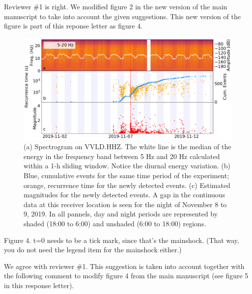 \documentclass[10pt]{extarticle}
\begin{document}
\begin{Answer}
Reviewer \#1 is right. We modified figure 2 in the new version of the main manuscript to take into account the given suggestions. This new version of the figure is part of this reponse letter as figure 4.
 \WorkInProgressRevTask
\begin{figure}[!h]
\begin{center}
 \includegraphics[width=1\linewidth]{spec_rec_mag.png} 
 \caption{(a) Spectrogram on VVLD.HHZ. The white line is the median of the energy in the frequency band between 5 Hz and 20 Hz calculated within a 1-h sliding window. Notice the diurnal energy variation. (b) Blue, cumulative events for the same time period of the experiment; orange, recurrence time for the newly detected events. (c) Estimated magnitudes for the newly detected events. A gap in the continuous data at this receiver location is seen for the night of November 8 to 9, 2019. In all pannels, day and night periods are represented by shaded (18:00 to 6:00) and unshaded (6:00 to 18:00) regions.}
\end{center}
\label{fig:new_fig_2}
\end{figure}
\end{Answer}
%
%


\begin{ReviewerComment}{1}
\noindent 
Figure 4. t=0 needs to be a tick mark, since that's the mainshock. (That way, you do not need the legend item for the mainshock either.)
\end{ReviewerComment}


\begin{Answer}
 \WorkInProgressRevTask
We agree with reviewer \#1. This suggestion is taken into account together with the following comment to modify figure 4 from the main manuscript (see figure 5 in this response letter).
\end{Answer}
%
%
\end{document}
